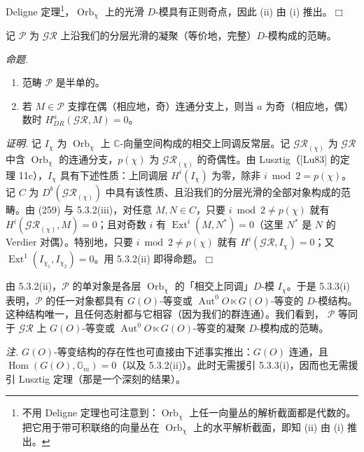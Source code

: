 
Deligne 定理\footnote{不用 Deligne 定理也可注意到：$\operatorname{Orb}_\chi$ 上任一向量丛的解析截面都是代数的。把它用于带可积联络的向量丛在 $\operatorname{Orb}_\chi$ 上的水平解析截面，即知 (ii) 由 (i) 推出。}，$\operatorname{Orb}_\chi$ 上的光滑 $D$-模具有正则奇点，因此 (ii) 由 (i) 推出。\hfill$\Box$

记 $\mathcal{P}$ 为 $\mathcal{GR}$ 上沿我们的分层光滑的凝聚（等价地，完整）$D$-模构成的范畴。

 \emph{命题.}

\begin{enumerate}[label=(\roman*),leftmargin=2.2em]
\item 范畴 $\mathcal{P}$ 是半单的。
\item 若 $M\in\mathcal{P}$ 支撑在偶（相应地，奇）连通分支上，则当 $a$ 为奇（相应地，偶）数时 $H^{a}_{DR}(\mathcal{GR},M)=0$。
\end{enumerate}

\emph{证明.} 记 $I_\chi$ 为 $\operatorname{Orb}_\chi$ 上 $\mathbb{C}$-向量空间构成的相交上同调反常层。记 $\mathcal{GR}_{(\chi)}$ 为 $\mathcal{GR}$ 中含 $\operatorname{Orb}_\chi$ 的连通分支，$p(\chi)$ 为 $\mathcal{GR}_{(\chi)}$ 的奇偶性。由 Lusztig（[Lu83] 的定理 11c），$I_\chi$ 具有下述性质：上同调层 $H^{i}(I_\chi)$ 为零，除非 $i\bmod 2=p(\chi)$。记 $C$ 为 $D^{b}(\mathcal{GR}_{(\chi)})$ 中具有该性质、且沿我们的分层光滑的全部对象构成的范畴。由 (259) 与 5.3.2(iii)，对任意 $M,N\in C$，只要 $i\bmod 2\neq p(\chi)$ 就有 $H^{i}(\mathcal{GR}_{(\chi)},M)=0$；且对奇数 $i$ 有 $\operatorname{Ext}^{i}(M,N^{*})=0$（这里 $N^{*}$ 是 $N$ 的 Verdier 对偶）。特别地，只要 $i\bmod 2\neq p(\chi)$ 就有 $H^{i}(\mathcal{GR},I_\chi)=0$；又 $\operatorname{Ext}^{1}(I_{\chi_1},I_{\chi_2})=0$。用 5.3.2(ii) 即得命题。\hfill$\Box$

 由 5.3.2(ii)，$\mathcal{P}$ 的单对象是各层 $\operatorname{Orb}_\chi$ 的「相交上同调」$D$-模 $I_\chi$。于是 5.3.3(i) 表明，$\mathcal{P}$ 的任一对象都具有 $G(O)$-等变或 $\operatorname{Aut}^{0}O\ltimes G(O)$-等变的 $D$-模结构。这种结构唯一，且任何态射都与它相容（因为我们的群连通）。我们看到，
$\mathcal{P}$ 等同于 $\mathcal{GR}$ 上 $G(O)$-等变或 $\operatorname{Aut}^{0}O\ltimes G(O)$-等变的凝聚 $D$-模构成的范畴。

\emph{注.} $G(O)$-等变结构的存在性也可直接由下述事实推出：$G(O)$ 连通，且 $\operatorname{Hom}(G(O),\mathbb{G}_m)=0$（以及 5.3.2(ii)）。此时无需援引 5.3.3(i)，因而也无需援引 Lusztig 定理（那是一个深刻的结果）。

